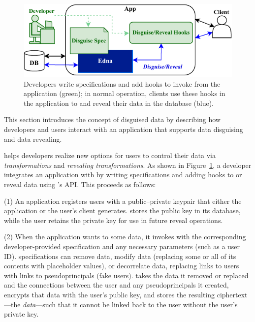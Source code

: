 \begin{figure}[t]
  \centering
    \includegraphics[width=.7\textwidth]{figs/edna_overview}
    \caption[Developers write disguise specifications and add hooks to invoke
    Edna's API.]{Developers write \xx specifications and add hooks to invoke
    \sys from the application (green); in normal operation, clients use these
    hooks in the application to \xx and reveal their data in the database
    (blue).}
  \label{f:edna-overview}
\end{figure}
%

This section introduces the concept of disguised data by describing how
developers and users interact with an application that supports data disguising
and data revealing.
%

%
\sys helps developers realize new options for users to control their data
via \emph{\xxing transformations} and \emph{revealing transformations}.
%
As shown in Figure~\ref{f:edna-overview}, a developer integrates an application
with \sys by writing \xx specifications and adding hooks to \xx or reveal data
using \sys's API. This proceeds as follows:

%
(1) An application registers users with a public--private keypair
that either the application or the user's client generates. \sys stores the
public key in its database, while the user retains the private key for use in
future reveal operations.
%

%
(2) When the application wants to \xx some data, it invokes \sys with the
corresponding developer-provided \xx specification and any necessary
parameters (such as a user ID).
%
\Xx specifications can remove data, modify data (replacing some or all of its
contents with placeholder values), or decorrelate data, replacing
links to users with links to pseudoprincipals (fake users).
%
%
\sys takes the data it removed or replaced and the connections between
the user and any pseudoprincipals it created, encrypts that data with the user's
public key, and stores the resulting ciphertext---the \emph{\xxed
data}---such that it cannot be linked back to the user without the user's
private key.
%

